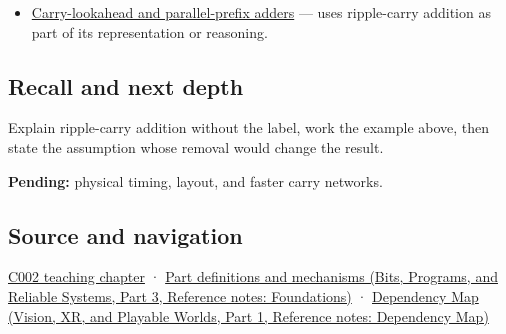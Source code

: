 \hypertarget{appendix-17917d9fdbe3-used-by}{}

\begin{itemize}
\tightlist
\item
  \hyperref[appendix-b5c46b2d94ff]{Carry-lookahead and parallel-prefix adders} --- uses ripple-carry addition as part of its representation or reasoning.
\end{itemize}

\subsection{Recall and next depth}\label{appendix-17917d9fdbe3-recall-and-next-depth}

\hypertarget{appendix-17917d9fdbe3-recall-and-next-depth}{}

Explain ripple-carry addition without the label, work the example above, then state the assumption whose removal would change the result.

\textbf{Pending:} physical timing, layout, and faster carry networks.

\subsection{Source and navigation}\label{appendix-17917d9fdbe3-source-and-navigation}

\hypertarget{appendix-17917d9fdbe3-source-and-navigation}{}

\hyperref[01-foundations-i-ch001-arithmetic-becomes-a-policy]{C002 teaching chapter} · \href{../01-Bits-Programs-and-Reliable-Systems-P03/main.pdf\#nameddest=appendix-fd090d982a15}{Part definitions and mechanisms (Bits, Programs, and Reliable Systems, Part 3, Reference notes: Foundations)} · \href{../07-Vision-XR-and-Playable-Worlds-P01/main.pdf\#nameddest=appendix-4ad47bdd269a}{Dependency Map (Vision, XR, and Playable Worlds, Part 1, Reference notes: Dependency Map)}
